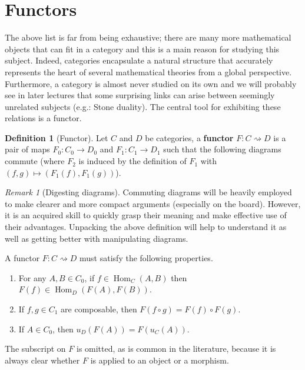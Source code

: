 \documentclass{article}
\theoremstyle{definition}
\newtheorem{defn}[thm]{Definition}
\theoremstyle{remark}
\newtheorem{rem}[thm]{Remark}
\DeclareMathOperator{\Hom}{Hom}
\begin{document}
\section{Functors}
The above list is far from being exhaustive; there are many more mathematical objects that can fit in a category and this is a main reason for studying this subject. Indeed, categories encapsulate a natural structure that accurately represents the heart of several mathematical theories from a global perspective. Furthermore, a category is almost never studied on its own and we will probably see in later lectures that some surprising links can arise between seemingly unrelated subjects (e.g.: Stone duality). The central tool for exhibiting these relations is a functor.
\begin{defn}[Functor]
	Let $C$ and $D$ be categories, a \textbf{functor} $F: C \rightsquigarrow D$ is a pair of maps $F_0:C_0 \rightarrow D_0$ and $F_1:C_1 \rightarrow D_1$ such that the following diagrams commute (where $F_2$ is induced by the definition of $F_1$ with $(f,g) \mapsto (F_1(f), F_1(g))$).
	\begin{figure}[h]
		\centering
		\qquad 
		\qquad
	\end{figure}
\end{defn}
\begin{rem}[Digesting diagrams]
	Commuting diagrams will be heavily employed to make clearer and more compact arguments (especially on the board). However, it is an acquired skill to quickly grasp their meaning and make effective use of their advantages. Unpacking the above definition will help to understand it as well as getting better with manipulating diagrams.
	
	A functor $F:C\rightsquigarrow D$ must satisfy the following properties.
	\begin{enumerate}
		\item For any $A, B \in C_0$, if $f \in \Hom_C(A,B)$ then $F(f) \in \Hom_D(F(A), F(B))$.
		\item If $f,g \in C_1$ are composable, then $F(f\circ g) = F(f) \circ F(g)$.
		\item If $A \in C_0$, then $u_D(F(A)) = F(u_C(A))$.
	\end{enumerate}
	The subscript on $F$ is omitted, as is common in the literature, because it is always clear whether $F$ is applied to an object or a morphism.
\end{rem}
\end{document}
